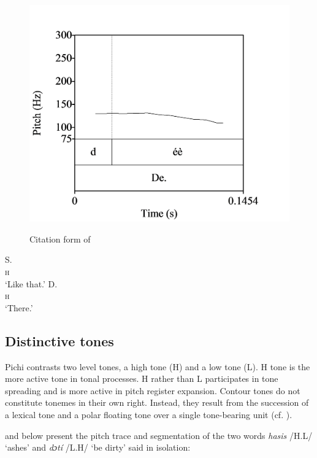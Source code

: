 \begin{figure}
\caption{Citation form of }
\includegraphics[height=.3\textheight]{figures/yakpomod-img6.png}
\label{fig:key:3.4} 
\end{figure} 

\ea\label{ex:key:45}
\gll      S.\\
\textsc{h}\\
\glt ‘Like that.’
\z
\ea\label{ex:key:46}
\gll    D.\\
\textsc{h}\\
\glt ‘There.’
\z

\subsection{Distinctive tones}

Pichi contrasts two level tones, a high tone (H) and a low tone (L). H tone is the more active tone in tonal processes. H rather than L participates in tone spreading and is more active in pitch register expansion. Contour tones do not constitute tonemes in their own right. Instead, they result from the succession of a lexical tone and a polar floating tone over a single tone-bearing unit (cf. ). 

 and  below present the pitch trace and segmentation of the two words \textit{hasis} /H.L/ ‘ashes’ and \textit{dɔtí} /L.H/ ‘be dirty’ said in isolation:

